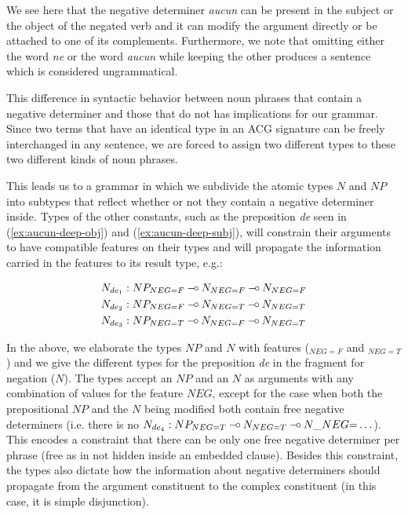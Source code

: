 \documentclass{llncs}
\def\limp {\mathbin{{-}\mkern-3.5mu{\circ}}}
\begin{document}
We see here that the negative determiner \emph{aucun} can be present in
the subject or the object of the negated verb and it can modify the
argument directly or be attached to one of its complements. Furthermore,
we note that omitting either the word \emph{ne} or the word \emph{aucun}
while keeping the other produces a sentence which is considered
ungrammatical.

This difference in syntactic behavior between noun phrases that contain a
negative determiner and those that do not has implications for our
grammar. Since two terms that have an identical type in an ACG signature can
be freely interchanged in any sentence, we are forced to assign two different
types to these two different kinds of noun phrases.


This leads us to a grammar in which we subdivide the atomic types $N$
and $NP$ into subtypes that reflect whether or not they contain a
negative determiner inside. Types of the other constants, such as the
preposition \emph{de} seen in (\ref{ex:aucun-deep-obj}) and
(\ref{ex:aucun-deep-subj}), will constrain their arguments to have
compatible features on their types and will propagate the information
carried in the features to its result type, e.g.:

\begin{align*}
N_{de_1} &: NP_{NEG{=}F} \limp N_{NEG{=}F} \limp N_{NEG{=}F} \\
N_{de_2} &: NP_{NEG{=}F} \limp N_{NEG{=}T} \limp N_{NEG{=}T} \\
N_{de_3} &: NP_{NEG{=}T} \limp N_{NEG{=}F} \limp N_{NEG{=}T}
\end{align*}

In the above, we elaborate the types $NP$ and $N$ with features ($_{NEG{=}F}$
and $_{NEG{=}T}$) and we give the different types for the preposition \emph{de}
in the fragment for negation ($N$). The types accept an $NP$ and an $N$ as
arguments with any combination of values for the feature $NEG$, except for the
case when both the prepositional $NP$ and the $N$ being modified both contain
free negative determiners (i.e. there is no $N_{de_4} : NP_{NEG{=}T} \limp
N_{NEG{=}T} \limp N\_NEG{=}\ldots$). This encodes a constraint that there can
be only one free negative determiner per phrase (free as in not hidden inside
an embedded clause). Besides this constraint, the types also dictate how the
information about negative determiners should propagate from the argument
constituent to the complex constituent (in this case, it is simple
disjunction).
\end{document}
